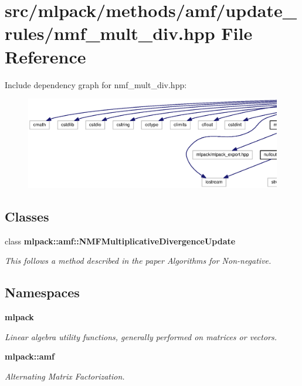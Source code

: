 \section{src/mlpack/methods/amf/update\+\_\+rules/nmf\+\_\+mult\+\_\+div.hpp File Reference}
\label{nmf__mult__div_8hpp}
Include dependency graph for nmf\+\_\+mult\+\_\+div.\+hpp\+:
\nopagebreak
\begin{figure}[H]
\begin{center}
\leavevmode
\includegraphics[width=350pt]{nmf__mult__div_8hpp__incl}
\end{center}
\end{figure}
\subsection*{Classes}
\begin{DoxyCompactItemize}
\item 
class {\bf mlpack\+::amf\+::\+N\+M\+F\+Multiplicative\+Divergence\+Update}
\begin{DoxyCompactList}\small\item\em This follows a method described in the paper \textquotesingle{}Algorithms for Non-\/negative. \end{DoxyCompactList}\end{DoxyCompactItemize}
\subsection*{Namespaces}
\begin{DoxyCompactItemize}
\item 
 {\bf mlpack}
\begin{DoxyCompactList}\small\item\em Linear algebra utility functions, generally performed on matrices or vectors. \end{DoxyCompactList}\item 
 {\bf mlpack\+::amf}
\begin{DoxyCompactList}\small\item\em Alternating Matrix Factorization. \end{DoxyCompactList}\end{DoxyCompactItemize}
